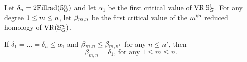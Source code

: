 \subsubsection{}
\label{subsub:foundamental_bar_rpn_lemma}

Let $\delta_n=2\mathrm{Fillrad}(\mathbb{S}^n_G)$ and
let $\alpha_1$ be the first critical value of $\operatorname{VR}\mathbb{S}^1_G$.
For any degree $1 \leq m \leq n$, let $\beta_{m, n}$ be the first critical value of the $m^{\mathrm{th}}$ reduced homology of $\operatorname{VR}(\mathbb{S}^n_G)$.

\medskip\lemma
If $\delta_1 = \dots = \delta_n \leq \alpha_1$ and $\beta_{m, n} \leq \beta_{m, n'}$ for any $n\leq n'$, then
\[
\beta_{m, n} = \delta_1, \, \text{for any $1 \leq m \leq n$.}
\]


